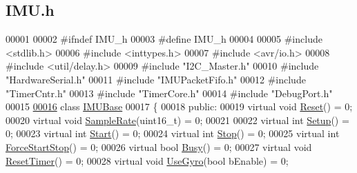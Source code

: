 \hypertarget{_i_m_u_8h_source}{
\subsection{IMU.h}
}

\begin{DoxyCode}
00001 
00002 \textcolor{preprocessor}{#ifndef IMU\_h}
00003 \textcolor{preprocessor}{}\textcolor{preprocessor}{#define IMU\_h}
00004 \textcolor{preprocessor}{}
00005 \textcolor{preprocessor}{#include <stdlib.h>}
00006 \textcolor{preprocessor}{#include <inttypes.h>}
00007 \textcolor{preprocessor}{#include <avr/io.h>}
00008 \textcolor{preprocessor}{#include <util/delay.h>}
00009 \textcolor{preprocessor}{#include "I2C\_Master.h"}
00010 \textcolor{preprocessor}{#include "HardwareSerial.h"}
00011 \textcolor{preprocessor}{#include "IMUPacketFifo.h"}
00012 \textcolor{preprocessor}{#include "TimerCntr.h"}
00013 \textcolor{preprocessor}{#include "TimerCore.h"}
00014 \textcolor{preprocessor}{#include "DebugPort.h"}
00015 
\hypertarget{_i_m_u_8h_source_l00016}{}\hyperlink{class_i_m_u_base}{00016} \textcolor{keyword}{class }\hyperlink{class_i_m_u_base}{IMUBase}
00017 \{
00018 \textcolor{keyword}{public}:
00019     \textcolor{keyword}{virtual} \textcolor{keywordtype}{void} \hyperlink{class_i_m_u_base_a27fdd96992dfa8867943407fc400d071}{Reset}() = 0;
00020     \textcolor{keyword}{virtual} \textcolor{keywordtype}{void} \hyperlink{class_i_m_u_base_ad4f6b6562edc0e2b76591d0deca191d7}{SampleRate}(uint16\_t) = 0;
00021     
00022     \textcolor{keyword}{virtual} \textcolor{keywordtype}{int} \hyperlink{class_i_m_u_base_a74d84beba0da335f49aa7ce94612cf13}{Setup}() = 0;
00023     \textcolor{keyword}{virtual} \textcolor{keywordtype}{int} \hyperlink{class_i_m_u_base_af31c2ed51cd36cc3230ebbb58757784a}{Start}() = 0;
00024     \textcolor{keyword}{virtual} \textcolor{keywordtype}{int} \hyperlink{class_i_m_u_base_a5b136166ec3849cbc1f93a13367eb08d}{Stop}() = 0;
00025     \textcolor{keyword}{virtual} \textcolor{keywordtype}{int} \hyperlink{class_i_m_u_base_a60bf7f5f9728d11bae5ca64bc7a9c10b}{ForceStartStop}() = 0;
00026     \textcolor{keyword}{virtual} \textcolor{keywordtype}{bool} \hyperlink{class_i_m_u_base_adb8539af8660d291fdde1f38b3d644f3}{Busy}() = 0;
00027     \textcolor{keyword}{virtual} \textcolor{keywordtype}{void} \hyperlink{class_i_m_u_base_a6e65b709e0212f95299ce9fa464b4651}{ResetTimer}() = 0;
00028     \textcolor{keyword}{virtual} \textcolor{keywordtype}{void} \hyperlink{class_i_m_u_base_a9b4cc325e9858a8bb204733dc7906ec2}{UseGyro}(\textcolor{keywordtype}{bool} bEnable) = 0;

\end{DoxyCode}
